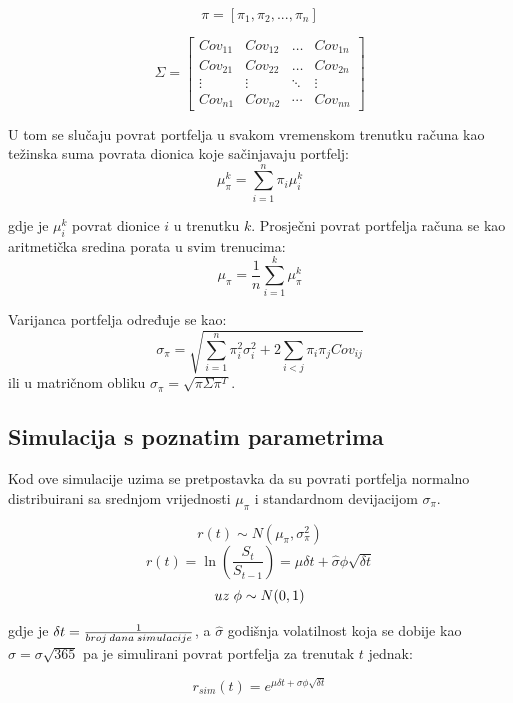 \documentclass[times, utf8, seminar]{fer}
\begin{document}
\[ \pi = [\pi_1, \pi_2,...,\pi_n] \]

\begin{equation*}
\Sigma =
\begin{bmatrix}
    Cov_{11} & Cov_{12} & \ldots & Cov_{1n} \\
    Cov_{21} & Cov_{22} & \ldots & Cov_{2n} \\
    \vdots & \vdots & \ddots & \vdots \\
    Cov_{n1} & Cov_{n2} & \cdots & Cov_{nn}
\end{bmatrix}
\end{equation*}

U tom se slučaju povrat portfelja u svakom vremenskom trenutku računa kao težinska suma povrata dionica koje sačinjavaju portfelj:
\[ \mu_{\pi}^k = \sum_{i=1}^{n}\pi_i\mu_i^k \]

\noindent gdje je $\mu_i^k$ povrat dionice $i$ u trenutku $k$. Prosječni povrat portfelja računa se kao aritmetička sredina porata u svim trenucima:
\[ \mu_{\pi} = \frac{1}{n}\sum_{i=1}^{k}\mu_{\pi}^{k} \]

\noindent Varijanca portfelja određuje se kao:
\[ \sigma_{\pi} = \sqrt{\sum_{i=1}^{n}\pi_i^2\sigma_i^2 + 2\sum_{i<j}\pi_i\pi_jCov_{ij}}\]
ili u matričnom obliku \( \sigma_{\pi} = \sqrt{\pi\Sigma\pi^T} \).

\subsection{Simulacija s poznatim parametrima}
Kod ove simulacije uzima se pretpostavka da su povrati portfelja normalno distribuirani sa srednjom vrijednosti $\mu_{\pi}$ i standardnom devijacijom $\sigma_{\pi}$.

\[ r(t) \sim N(\mu_{\pi}, \sigma_{\pi}^2)\]
\[ r(t) = \ln(\frac{S_{t}}{S_{t-1}}) = \mu\delta t + \hat{\sigma}\phi\sqrt{\delta t}\]
\[ uz \hspace{0.1cm} \phi \sim N(0,1) \]


\noindent gdje je $\delta t = \frac{1}{broj \hspace{0.07cm} dana \hspace{0.07cm} simulacije}$, a $\hat{\sigma}$ godišnja volatilnost koja se dobije kao $\hat{\sigma} = \sigma\sqrt{365}$ pa je simulirani povrat portfelja za trenutak $t$ jednak:

\[ r_{sim}(t) = e^{\mu\delta t + \sigma\phi\sqrt{\delta t}} \]
\end{document}
